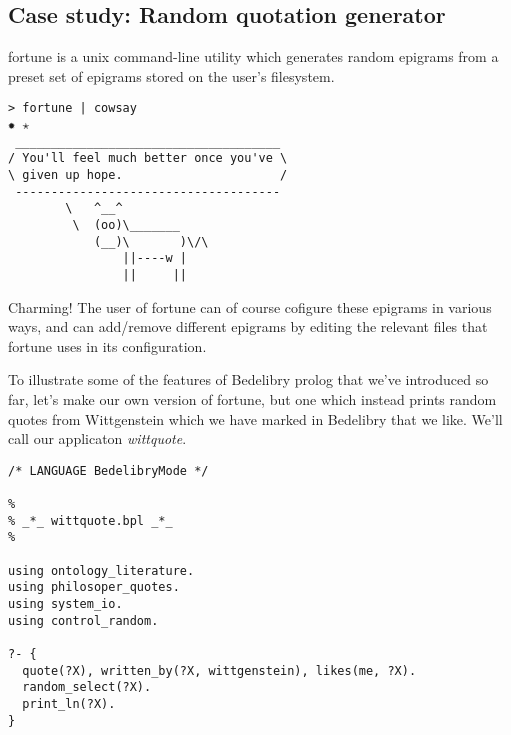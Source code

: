 \documentclass{book}
\begin{document}
\subsection{Case study: Random quotation generator}

fortune is a unix command-line utility which generates random epigrams from a preset set of epigrams stored on the user's filesystem. 

\begin{verbatim}
> fortune | cowsay                                                                                                                                                                                             ✹ ✭
 _____________________________________
/ You'll feel much better once you've \
\ given up hope.                      /
 -------------------------------------
        \   ^__^
         \  (oo)\_______
            (__)\       )\/\
                ||----w |
                ||     ||
\end{verbatim}

\noindent Charming! The user of fortune can of course cofigure these epigrams in various ways, and can add/remove different epigrams by editing the relevant files that fortune uses in its configuration.

To illustrate some of the features of Bedelibry prolog that we've introduced so far, let's make our own version of fortune, but one which instead prints random quotes from Wittgenstein which we have marked in Bedelibry that we like. We'll call our applicaton \textit{wittquote}.

\begin{verbatim}
/* LANGUAGE BedelibryMode */

%
% _*_ wittquote.bpl _*_
%

using ontology_literature.
using philosoper_quotes.
using system_io.
using control_random.

?- {
  quote(?X), written_by(?X, wittgenstein), likes(me, ?X).
  random_select(?X). 
  print_ln(?X).
}
\end{verbatim}
\end{document}
